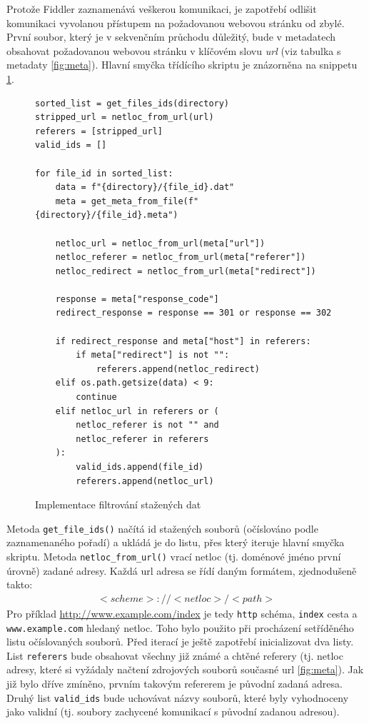 \documentclass[thesis=M,czech,hidelinks]{FITthesis}[2013/05/06]
\begin{document}
Protože Fiddler zaznamenává veškerou komunikaci, je zapotřebí odlišit komunikaci vyvolanou přístupem na požadovanou webovou stránku od zbylé. První soubor, který je v sekvenčním průchodu důležitý, bude v metadatech obsahovat požadovanou webovou stránku v klíčovém slovu \textit{url} (viz tabulka s metadaty \ref{fig:meta}). Hlavní smyčka třídícího skriptu je znázorněna na snippetu \ref{snip:filter}. 

\begin{figure}[h]               
\begin{verbatim}
sorted_list = get_files_ids(directory)
stripped_url = netloc_from_url(url)
referers = [stripped_url]
valid_ids = []

for file_id in sorted_list:
    data = f"{directory}/{file_id}.dat"
    meta = get_meta_from_file(f"{directory}/{file_id}.meta")

    netloc_url = netloc_from_url(meta["url"])
    netloc_referer = netloc_from_url(meta["referer"])
    netloc_redirect = netloc_from_url(meta["redirect"])

    response = meta["response_code"]
    redirect_response = response == 301 or response == 302
    
    if redirect_response and meta["host"] in referers:
        if meta["redirect"] is not "":
            referers.append(netloc_redirect)
    elif os.path.getsize(data) < 9:
        continue
    elif netloc_url in referers or (
        netloc_referer is not "" and 
        netloc_referer in referers
    ):
        valid_ids.append(file_id)
        referers.append(netloc_url)

\end{verbatim}      
\caption{Implementace filtrování stažených dat}
\label{snip:filter}
\end{figure}

Metoda \texttt{get_file_ids()} načítá id stažených souborů (očíslováno podle zaznamenaného pořadí) a ukládá je do listu, přes který iteruje hlavní smyčka skriptu. Metoda \texttt{netloc_from_url()} vrací netloc (tj. doménové jméno první úrovně) zadané adresy. Každá url adresa se řídí daným formátem, zjednodušeně takto:
\begin{eqnarray}
<scheme>://<netloc>/<path>
\end{eqnarray}
Pro příklad \url{http://www.example.com/index} je tedy \texttt{http} schéma, \texttt{index} cesta a \texttt{www.example.com} hledaný netloc. Toho bylo použito při procházení setříděného listu očíslovaných souborů. Před iterací je ještě zapotřebí inicializovat dva listy. List \texttt{referers} bude obsahovat všechny již známé a chtěné referery (tj. netloc adresy, které si vyžádaly načtení zdrojových souborů současné url \ref{fig:meta}). Jak již bylo dříve zmíněno, prvním takovým refererem je původní zadaná adresa. Druhý list \texttt{valid_ids} bude uchovávat názvy souborů, které byly vyhodnoceny jako validní (tj. soubory zachycené komunikací s původní zadanou adresou).
\end{document}
